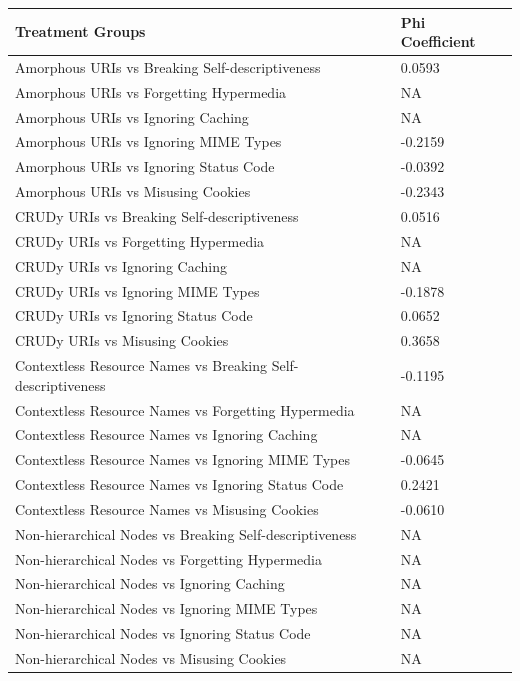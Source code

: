 \begin{table}[ht!]
    \centering
    \small
     \begin{tabular}{|l|l|}
\hline \textbf{Treatment Groups} & \textbf{Phi Coefficient} 
\\ \hline 
Amorphous URIs vs Breaking Self-descriptiveness & 0.0593
\\ \hline
Amorphous URIs vs Forgetting Hypermedia & NA
\\ \hline
Amorphous URIs vs Ignoring Caching & NA
\\ \hline
Amorphous URIs vs Ignoring MIME Types & -0.2159
\\ \hline
Amorphous URIs vs Ignoring Status Code & -0.0392
\\ \hline
Amorphous URIs vs Misusing Cookies & -0.2343
\\ \hline
CRUDy URIs vs Breaking Self-descriptiveness & 0.0516
\\ \hline
CRUDy URIs vs Forgetting Hypermedia & NA
\\ \hline
CRUDy URIs vs Ignoring Caching & NA
\\ \hline
CRUDy URIs vs Ignoring MIME Types & -0.1878
\\ \hline
CRUDy URIs vs Ignoring Status Code & 0.0652
\\ \hline
CRUDy URIs vs Misusing Cookies & 0.3658
\\ \hline
Contextless Resource Names vs Breaking Self-descriptiveness & -0.1195
\\ \hline
Contextless Resource Names vs Forgetting Hypermedia & NA
\\ \hline
Contextless Resource Names vs Ignoring Caching & NA
\\ \hline
Contextless Resource Names vs Ignoring MIME Types & -0.0645
\\ \hline
Contextless Resource Names vs Ignoring Status Code & 0.2421
\\ \hline
Contextless Resource Names vs Misusing Cookies & -0.0610
\\ \hline
Non-hierarchical Nodes vs Breaking Self-descriptiveness & NA
\\ \hline
Non-hierarchical Nodes vs Forgetting Hypermedia & NA
\\ \hline
Non-hierarchical Nodes vs Ignoring Caching & NA
\\ \hline
Non-hierarchical Nodes vs Ignoring MIME Types & NA
\\ \hline
Non-hierarchical Nodes vs Ignoring Status Code & NA
\\ \hline
Non-hierarchical Nodes vs Misusing Cookies & NA

\end{tabular}
\end{table}
